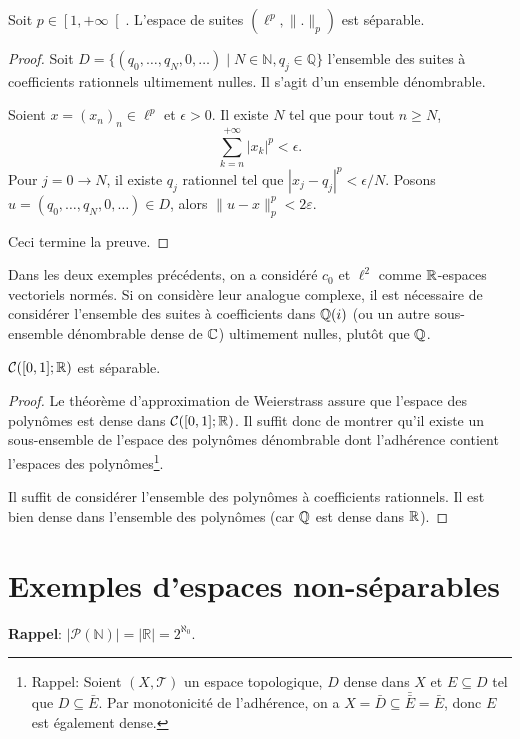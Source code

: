\begin{ex}
  Soit $p \in \left[1, +\infty\right[$.
  L'espace de suites $(\ell^p, \|.\|_p)$ est séparable.
\end{ex}
\begin{proof}
  Soit $D = \{(q_0, \ldots, q_N, 0, \ldots)\mid
  N\in\mathbb N, q_j \in\mathbb Q\}$ l'ensemble des suites à coefficients
  rationnels ultimement nulles. Il s'agit d'un ensemble dénombrable.

  Soient $x = (x_n)_n\in \ell ^p$ et $\epsilon >0$. Il existe $N$ tel que
  pour tout $n \geq N$,
  $$\sum_{k=n}^{+\infty}|x_k|^p < \epsilon.$$
  Pour $j = 0 \to N$, il existe $q_j$ rationnel tel que
  $|x_j-q_j|^p<\epsilon/N$. Posons $u=(q_0, \ldots, q_N, 0, \ldots)\in D$, alors
  $\|u-x\|^p_p<2\varepsilon$.

  Ceci termine la preuve.
\end{proof}

\begin{rem}
  Dans les deux exemples précédents, on a considéré $c_0$ et $\ell^2$
  comme $\mathbb{R}$-espaces vectoriels normés. Si on considère leur analogue
  complexe, il est nécessaire de considérer l'ensemble des suites à
  coefficients dans $\mathbb{Q}(i)$ (ou un autre sous-ensemble dénombrable dense
  de $\mathbb{C}$) ultimement nulles, plutôt que $\mathbb{Q}$.
\end{rem}

\begin{ex}
  $\mathcal C([0, 1]; \mathbb{R})$ est séparable.
\end{ex}
\begin{proof}
  Le théorème d'approximation de Weierstrass assure que l'espace des polynômes
  est dense dans $\mathcal C([0, 1]; \mathbb{R})$. Il suffit donc de montrer qu'il
  existe un sous-ensemble de l'espace des polynômes dénombrable dont l'adhérence
  contient l'espaces des polynômes\footnote{Rappel: Soient $(X, \mathcal T)$ un
    espace topologique, $D$ dense dans $X$ et $E\subseteq D$ tel
    que $D\subseteq \bar E$. Par monotonicité de l'adhérence, on a
    $X = \bar D \subseteq \bar{\bar E} =\bar E$, donc $E$ est également dense.}.

  Il suffit de considérer l'ensemble des polynômes à coefficients
  rationnels. Il est bien dense dans l'ensemble des polynômes (car $\mathbb{Q}$
  est dense dans $\mathbb{R}$).
\end{proof}
\section{Exemples d'espaces non-séparables}
\textbf{Rappel}: $|\mathcal P (\mathbb N)| = |\mathbb R| = 2^{\aleph_0}$.

